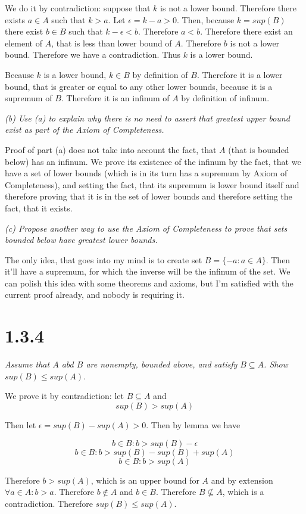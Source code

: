 \documentclass[11pt,oneside,titlepage]{book}
\begin{document}
We do it by contradiction: suppose that $k$ is not a lower bound. Therefore
there exists $a \in A$ such that $k > a$. Let $\epsilon = k - a > 0$. Then,
because $k = sup(B)$ there exist $b \in B$ such that $k - \epsilon < b$.
Therefore $a < b$. Therefore there exist an element of $A$, that is less than
lower bound of $A$. Therefore $b$ is not a lower bound. Therefore we have a
contradiction. Thus $k$ is a lower bound.

Because $k$ is a lower bound, $k \in B$ by definition of $B$. Therefore it is
a lower bound, that is greater or equal to any other lower bounds, because it
is a supremum of $B$. Therefore it is an infinum of $A$ by definition of
infinum.

\textit{(b) Use (a) to explain why there is no need to assert that greatest
  upper bound exist as part of the Axiom of Completeness.}

Proof of part (a) does not take into account the fact, that $A$ (that is
bounded below) has an infinum. We prove its existence of the infinum by
the fact, that we have a set of lower bounds (which is in its turn
has a supremum by Axiom of Completeness), and setting the fact, that its
supremum is lower bound itself  and therefore proving that it is in the set of
lower bounds and therefore setting the fact, that it exists.

\textit{(c) Propose another way to use the Axiom of Completeness to prove
  that sets bounded below have greatest lower bounds.}

The only idea, that goes into my mind is to create set $B = \{-a: a \in A\}$.
Then it'll have a supremum, for which the inverse will be the infinum of the
set. We can polish this idea with some theorems and axioms, but I'm satisfied
with the current proof already, and nobody is requiring it.

\section*{1.3.4}
\textit{Assume that $A$ abd $B$ are nonempty, bounded above, and satisfy
  $B \subseteq A$. Show $sup(B) \leq sup(A)$.}

We prove it by contradiction: let $B \subseteq A$ and
$$sup(B) > sup(A)$$

Then let $\epsilon = sup(B) - sup(A) > 0$. Then by lemma we have

$$b \in B: b > sup(B) - \epsilon$$
$$b \in B: b > sup(B) - sup(B) + sup(A)$$
$$b \in B: b > sup(A)$$

Therefore $b > sup(A)$, which is an upper bound for $A$ and by extension
$\forall a \in A: b > a$. Therefore $b \notin A$ and $b \in B$. Therefore
$B \not\subseteq A$, which is a contradiction. Therefore $sup(B) \leq sup(A)$.
\end{document}
